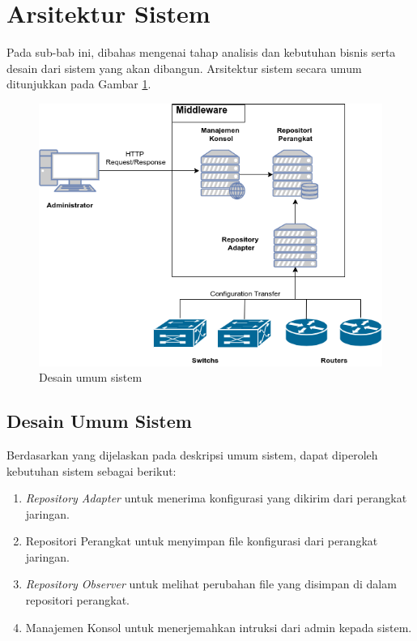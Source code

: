 	\section{Arsitektur Sistem}
		Pada sub-bab ini, dibahas mengenai tahap analisis dan kebutuhan bisnis serta desain dari sistem yang akan dibangun. Arsitektur sistem secara umum ditunjukkan pada Gambar \ref{DesainUmumSistem}.\\
		\begin{figure}[H]
			\centering
			\includegraphics[width=\textwidth]{Images/C-3/Desain-Umum-TA-4.png}
			\caption{Desain umum sistem}
			\label{DesainUmumSistem}
		\end{figure}

		\subsection{Desain Umum Sistem}
			Berdasarkan yang dijelaskan pada deskripsi umum sistem, dapat diperoleh kebutuhan sistem sebagai berikut:
			\begin{enumerate}
				\item \textit{Repository Adapter} untuk menerima konfigurasi yang dikirim dari perangkat jaringan.
				\item Repositori Perangkat untuk menyimpan file konfigurasi dari perangkat jaringan.
				\item \textit{Repository Observer} untuk melihat perubahan file yang disimpan di dalam repositori perangkat.
				\item Manajemen Konsol untuk menerjemahkan intruksi dari admin kepada sistem.
			\end{enumerate}
                
